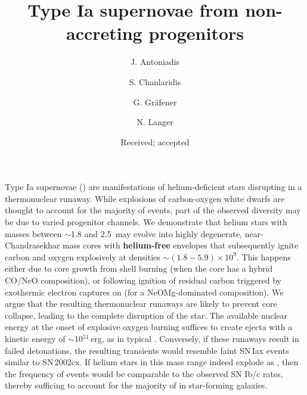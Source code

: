 \documentclass[twocolumn]{aa}
\begin{document}
\title{Type Ia supernovae from non-accreting progenitors}
 


   \author{J. Antoniadis 
   \and S. Chanlaridis 
   \and G. Gr\"{a}fener
   \and N. Langer
          }


   \date{Received; accepted}





\abstract 
{Type Ia supernovae (\ias) are  manifestations of helium-deficient stars disrupting in a 
thermonuclear runaway. While explosions of carbon-oxygen white dwarfs are 
thought to account for the majority of events, part of the observed diversity 
may be due to varied progenitor channels. We demonstrate that 
helium stars with masses between $\sim$1.8 and 2.5\msun\ may evolve 
into highly degenerate, near-Chandrasekhar mass cores with 
{\bf helium-free} envelopes that subsequently  ignite carbon and oxygen explosively at densities $\sim(1.8-5.9)\times 10^{9}$\denu. This happens either due to core growth from 
shell burning (when the core has a hybrid CO/NeO composition), 
or following ignition of residual carbon triggered by  
exothermic electron captures on  (for a 
NeOMg-dominated  composition).
 We argue that the resulting 
thermonuclear runaways are likely to prevent core collapse, leading to the complete disruption of the star.
 The available nuclear energy at the onset of 
 explosive oxygen burning suffices to create 
 ejecta with a kinetic energy of $\sim$10$^{51}$\,erg, as in typical \ias. 
 Conversely, if these  runaways  result in failed detonations, the resulting transients would resemble faint 
 SN\,Iax events similar to SN\,2002cx. 
If helium stars in this mass range indeed explode as \ias, then the frequency of events would be comparable to the observed SN Ib/c rates, thereby sufficing to account for the majority of \ias in star-forming galaxies.}



\maketitle
\end{document}
